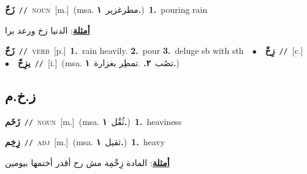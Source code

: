\documentclass[10pt,a4paper,twoside]{article} %
\begin{document}
\begin{multicols}{2}
{\setlength\topsep{0pt}\textbf{\foreignlanguage{arabic}{زَخّ}}\ {\color{gray}\texttt{//}\color{black}}\ \textsc{noun}\ [m.]\ \color{gray}(msa. \foreignlanguage{arabic}{مطرغزير}~\foreignlanguage{arabic}{\textbf{١.}})\color{black}\ \textbf{1.}~pouring rain\  \begin{flushright}\color{gray}\foreignlanguage{arabic}{\textbf{\underline{\foreignlanguage{arabic}{أمثلة}}}: الدنيا زخ ورعد برا}\end{flushright}\color{black}} \vspace{2mm}

{\setlength\topsep{0pt}\textbf{\foreignlanguage{arabic}{زَخّ}}\ {\color{gray}\texttt{//}\color{black}}\ \textsc{verb}\ [p.]\ \textbf{1.}~rain heavily.  \textbf{2.}~pour  \textbf{3.}~deluge sb with sth\ \ $\bullet$\ \ \setlength\topsep{0pt}\textbf{\foreignlanguage{arabic}{زِخّ}}\ {\color{gray}\texttt{//}\color{black}}\ [c.]\ \ $\bullet$\ \ \setlength\topsep{0pt}\textbf{\foreignlanguage{arabic}{يزِخّ}}\ {\color{gray}\texttt{//}\color{black}}\ [i.]\ \color{gray}(msa. \foreignlanguage{arabic}{تصُب}~\foreignlanguage{arabic}{\textbf{٢.}}  .\foreignlanguage{arabic}{تمطِر بغزارة}~\foreignlanguage{arabic}{\textbf{١.}})\color{black}\ } \vspace{2mm}

\vspace{-3mm}
\subsection*{\color{blue}\foreignlanguage{arabic}{ز.خ.م}\color{blue}{}} 

{\setlength\topsep{0pt}\textbf{\foreignlanguage{arabic}{زَخَم}}\ {\color{gray}\texttt{//}\color{black}}\ \textsc{noun}\ [m.]\ \color{gray}(msa. \foreignlanguage{arabic}{ثُقْل}~\foreignlanguage{arabic}{\textbf{١.}})\color{black}\ \textbf{1.}~heaviness\ } \vspace{2mm}

{\setlength\topsep{0pt}\textbf{\foreignlanguage{arabic}{زِخِم}}\ {\color{gray}\texttt{//}\color{black}}\ \textsc{adj}\ [m.]\ \color{gray}(msa. \foreignlanguage{arabic}{ثقيل}~\foreignlanguage{arabic}{\textbf{١.}})\color{black}\ \textbf{1.}~heavy\  \begin{flushright}\color{gray}\foreignlanguage{arabic}{\textbf{\underline{\foreignlanguage{arabic}{أمثلة}}}: المادة زِخْمِة مش رح أقدر أختمها بيومين}\end{flushright}\color{black}} \vspace{2mm}


\end{multicols}
\end{document}

